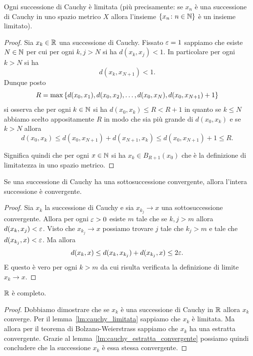 \begin{lemma}
\label{lm:cauchy_limitata}
Ogni successione di Cauchy è limitata
(più precisamente: se $x_n$ è una successione di Cauchy in uno spazio metrico $X$ allora l'insieme ${\left\{ x_n\colon n\in {\mathbb N} \right\}}$
è un insieme limitato).
\end{lemma}
%
\begin{proof}
Sia $x_k \in {\mathbb R}$ una successione di Cauchy.
Fissato $\varepsilon =1$ sappiamo che esiste $N\in {\mathbb N}$
per cui per ogni $k,j>N$ si ha
$d(x_k,x_j) < 1$. In particolare per ogni $k>N$ si ha
\[
  d(x_k, x_{N+1}) < 1.
\]
Dunque posto
\[
  R = \max{\left\{ d(x_0,x_1), d(x_0,x_2), \dots, d(x_0,x_N), d(x_0, x_{N+1}) + 1 \right\}}
\]
si osserva che per ogni $k\in {\mathbb N}$ si ha $d(x_0, x_k)\le R < R+1$ in quanto 
se $k \le N$ abbiamo scelto appositamente $R$ in modo che sia più grande di $d(x_0,x_k)$ e se $k > N$ allora
\[
  d(x_0,x_k) \le d(x_0,x_{N+1}) + d(x_{N+1},x_k)
    \le d(x_0,x_{N+1}) + 1 \le R.
\]

Significa quindi che per ogni $x\in {\mathbb N}$ si ha $x_k \in B_{R+1}(x_0)$ che è la definizione di limitatezza in uno
spazio metrico.
\end{proof}

\begin{lemma}
\label{lm:cauchy_estratta_convergente}
Se una successione di Cauchy ha una sottosuccessione convergente, allora l'intera successione è convergente.
\end{lemma}
%
\begin{proof}
Sia $x_k$ la successione di Cauchy e sia $x_{k_j}\to x$ una  sottosuccessione convergente.
Allora per ogni $\varepsilon>0$
esiste $m$ tale che se $k,j>m$ allora $d(x_k ,x_j) < \varepsilon$.
Visto che $x_{k_j} \to x$ possiamo trovare $j$ tale che $k_j > m$ e tale che $d(x_{k_j},x) < \varepsilon$. Ma allora
\[
  d(x_k,x) \le d(x_k, x_{k_j}) + d(x_{k_j},x)
   \le 2 \varepsilon.
\]
E questo è vero per ogni $k > m$ da cui risulta verificata la definizione di limite $x_k \to x$.
\end{proof}

\begin{theorem}[completezza di $\RR$]
\mymark{***}%
%
%
\label{th:R-completo}%
$\RR$ è completo.
\end{theorem}
%
\begin{proof}
\mymark{***}
Dobbiamo dimostrare che se $x_k$ è una successione di Cauchy in $\RR$ allora $x_k$ converge.
Per il lemma~\ref{lm:cauchy_limitata} sappiamo che $x_k$ è limitata.
Ma allora per il teorema di Bolzano-Weierstrass sappiamo che $x_k$ ha
una estratta convergente.
Grazie al lemma~\ref{lm:cauchy_estratta_convergente} possiamo quindi concludere
che la successione $x_k$ è essa stessa convergente.
\end{proof}

